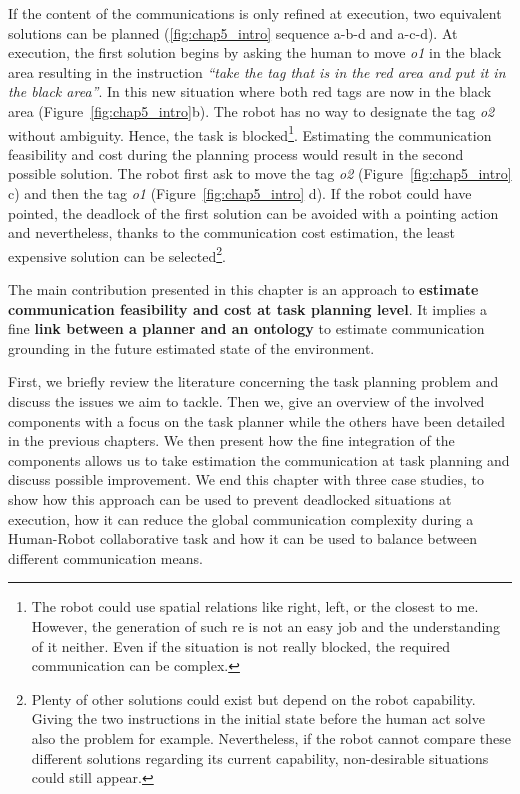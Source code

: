 If the content of the communications is only refined at execution, two equivalent solutions can be planned (\ref{fig:chap5_intro} sequence a-b-d and a-c-d). At execution, the first solution begins by asking the human to move \textit{o1} in the black area resulting in the instruction \textit{``take the tag that is in the red area and put it in the black area''}. In this new situation where both red tags are now in the black area (Figure~\ref{fig:chap5_intro}b). The robot has no way to designate the tag \textit{o2} without ambiguity. Hence, the task is blocked\footnote{The robot could use spatial relations like right, left, or the closest to me. However, the generation of such \acrshort{re} is not an easy job and the understanding of it neither. Even if the situation is not really blocked, the required communication can be complex. }. Estimating the communication feasibility and cost during the planning process would result in the second possible solution. The robot first ask to move the tag \textit{o2} (Figure~\ref{fig:chap5_intro} c) and then the tag \textit{o1} (Figure~\ref{fig:chap5_intro} d). If the robot could have pointed, the deadlock of the first solution can be avoided with a pointing action and nevertheless, thanks to the communication cost estimation, the least expensive solution can be selected\footnote{Plenty of other solutions could exist but depend on the robot capability. Giving the two instructions in the initial state before the human act solve also the problem for example. Nevertheless, if the robot cannot compare these different solutions regarding its current capability, non-desirable situations could still appear.}.

The main contribution presented in this chapter is an approach to \textbf{estimate communication feasibility and cost at task planning level}. It implies a fine \textbf{link between a planner and an ontology} to estimate communication grounding in the future estimated state of the environment.

First, we briefly review the literature concerning the task planning problem and discuss the issues we aim to tackle. Then we, give an overview of the involved components with a focus on the task planner while the others have been detailed in the previous chapters. We then present how the fine integration of the components allows us to take estimation the communication at task planning and discuss possible improvement. We end this chapter with three case studies, to show how this approach can be used to prevent deadlocked situations at execution, how it can reduce the global communication complexity during a Human-Robot collaborative task and how it can be used to balance between different communication means.

